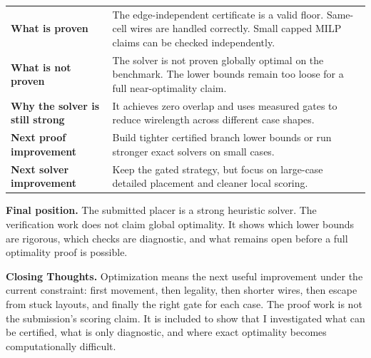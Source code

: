 \documentclass[11pt]{article}
\begin{document}
\begin{tabularx}{\textwidth}{>{\bfseries\color{navy}}p{}X}
What is proven & The edge-independent certificate is a valid floor. Same-cell wires are handled correctly. Small capped MILP claims can be checked independently. \\
What is not proven & The solver is not proven globally optimal on the benchmark. The lower bounds remain too loose for a full near-optimality claim. \\
Why the solver is still strong & It achieves zero overlap and uses measured gates to reduce wirelength across different case shapes. \\
Next proof improvement & Build tighter certified branch lower bounds or run stronger exact solvers on small cases. \\
Next solver improvement & Keep the gated strategy, but focus on large-case detailed placement and cleaner local scoring. \\
\end{tabularx}

\begin{resultbox}
\textbf{Final position.} The submitted placer is a strong heuristic solver. The verification work does not claim global optimality. It shows which lower bounds are rigorous, which checks are diagnostic, and what remains open before a full optimality proof is possible.
\end{resultbox}

\begin{warningbox}
\textbf{Closing Thoughts.} Optimization means the next useful improvement under the current constraint: first movement, then legality, then shorter wires, then escape from stuck layouts, and finally the right gate for each case. The proof work is not the submission's scoring claim. It is included to show that I investigated what can be certified, what is only diagnostic, and where exact optimality becomes computationally difficult.
\end{warningbox}
\end{document}
